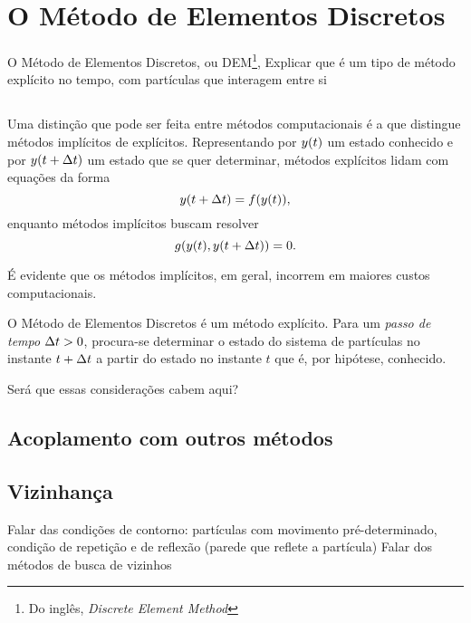 \chapter{O Método de Elementos Discretos} \label{ch:discrete_element_method}

O Método de Elementos Discretos, ou DEM\footnote{Do inglês, \textit{Discrete Element Method}}, \alert{Explicar que é um tipo de método explícito no tempo, com partículas que interagem entre si}

\section{}

Uma distinção que pode ser feita entre métodos computacionais é a que distingue métodos implícitos de explícitos. Representando por \(y\pqty{t}\) um estado conhecido e por \(y\pqty{t+\Dt}\) um estado que se quer determinar, métodos explícitos lidam com equações da forma
\[
	y\pqty{t+\Dt} = f\pqty{y\pqty{t}},
\]
enquanto métodos implícitos buscam resolver
\[
	g\pqty{y\pqty{t}, y\pqty{t+\Dt}} = 0.
\]

É evidente que os métodos implícitos, em geral, incorrem em maiores custos computacionais. 

O Método de Elementos Discretos é um método explícito. Para um \textit{passo de tempo} \(\Delta t>0\), procura-se determinar o estado do sistema de partículas no instante \(t+\Delta t\) a partir do estado no instante \(t\) que é, por hipótese, conhecido.

\alert{Será que essas considerações cabem aqui?}

\section{Acoplamento com outros métodos}

\section{Vizinhança} \label{sec:neighborhood}

\alert{Falar das condições de contorno: partículas com movimento pré-determinado, condição de repetição e de reflexão (parede que reflete a partícula)}
\alert{Falar dos métodos de busca de vizinhos}